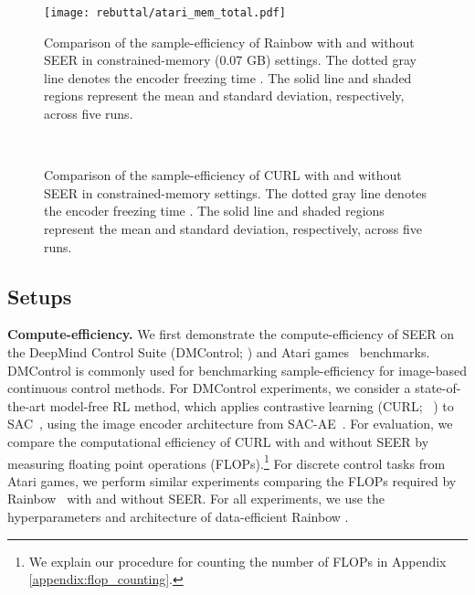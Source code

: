 \documentclass{article}
\begin{document}
\begin{figure*} [ht] \centering
\texttt{[image: rebuttal/atari\_mem\_total.pdf]}
\caption{Comparison of the sample-efficiency of Rainbow with and without SEER in constrained-memory (0.07 GB) settings. The dotted gray line denotes the encoder freezing time . The solid line and shaded regions represent the mean and standard deviation, respectively, across five runs.} \label{fig:memory_atari}
\vspace{-0.1in}
\end{figure*}

\begin{figure*} [t] \centering
{} 
\\
\caption{Comparison of the sample-efficiency of CURL with and without SEER in constrained-memory settings. The dotted gray line denotes the encoder freezing time . The solid line and shaded regions represent the mean and standard deviation, respectively, across five runs.} \label{fig:memory_dmc}
\vspace{-0.1in}
\end{figure*}

\subsection{Setups} \label{setups}

\textbf{Compute-efficiency.} 
We first demonstrate the compute-efficiency of SEER on the DeepMind Control Suite (DMControl; \citealt{tassa2018deepmind}) and Atari games~\citep{bellemare2013arcade} benchmarks.
DMControl is commonly used for benchmarking sample-efficiency for image-based continuous control methods.
For DMControl experiments,
we consider a state-of-the-art model-free RL method, which applies contrastive learning (CURL; ~\citealt{srinivas2020curl}) to SAC~\citep{haarnoja2018soft}, using the image encoder architecture from
SAC-AE~\citep{yarats2019improving}.
For evaluation,
we compare the computational efficiency of CURL with and without SEER by measuring floating point operations (FLOPs).\footnote{We explain our procedure for counting the number of FLOPs in Appendix \ref{appendix:flop_counting}.}
For discrete control tasks from Atari games,
we perform similar experiments comparing the FLOPs required by Rainbow~\citep{hessel2018rainbow} with and without SEER. For all experiments, we use the hyperparameters and architecture of data-efficient Rainbow \citep{van2019use}. 
\end{document}
